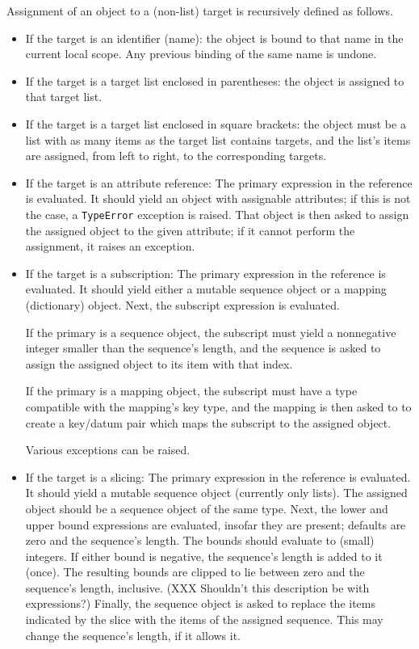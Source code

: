 Assignment of an object to a (non-list)
target is recursively defined as follows.

\begin{itemize}

\item
If the target is an identifier (name):
the object is bound to that name
in the current local scope.  Any previous binding of the same name
is undone.

\item
If the target is a target list enclosed in parentheses:
the object is assigned to that target list.

\item
If the target is a target list enclosed in square brackets:
the object must be a list with as many items
as the target list contains targets,
and the list's items are assigned, from left to right,
to the corresponding targets.

\item
If the target is an attribute reference:
The primary expression in the reference is evaluated.
It should yield an object with assignable attributes;
if this is not the case, a {\tt TypeError} exception is raised.
That object is then asked to assign the assigned object
to the given attribute; if it cannot perform the assignment,
it raises an exception.

\item
If the target is a subscription:
The primary expression in the reference is evaluated.
It should yield either a mutable sequence object or a mapping
(dictionary) object.
Next, the subscript expression is evaluated.

If the primary is a sequence object, the subscript must yield a
nonnegative integer smaller than the sequence's length,
and the sequence is asked to assign the assigned object
to its item with that index.

If the primary is a mapping object, the subscript must have a
type compatible with the mapping's key type,
and the mapping is then asked to to create a key/datum pair
which maps the subscript to the assigned object.

Various exceptions can be raised.

\item
If the target is a slicing:
The primary expression in the reference is evaluated.
It should yield a mutable sequence object (currently only lists).
The assigned object should be a sequence object of the same type.
Next, the lower and upper bound expressions are evaluated,
insofar they are present; defaults are zero and the sequence's length.
The bounds should evaluate to (small) integers.
If either bound is negative, the sequence's length is added to it (once).
The resulting bounds are clipped to lie between zero
and the sequence's length, inclusive.
(XXX Shouldn't this description be with expressions?)
Finally, the sequence object is asked to replace the items
indicated by the slice with the items of the assigned sequence.
This may change the sequence's length, if it allows it.

\end{itemize}

